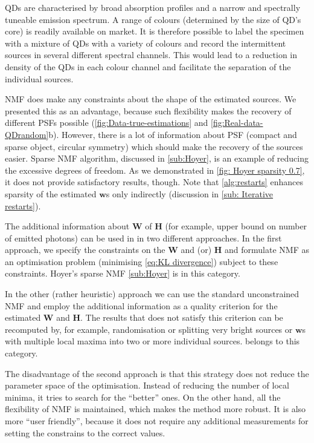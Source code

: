 QDs are characterised by broad absorption profiles and a narrow and spectrally tuneable emission spectrum. A range of colours (determined by the size of QD's core) is readily available on market. It is therefore possible to label the specimen with a mixture of QDs with a variety of colours and record the intermittent sources in several different spectral channels. This would lead to a reduction in density of the QDs in each colour channel and facilitate the separation of the individual sources. 

NMF does make any constraints about the shape of the estimated sources. We presented this as an advantage, because such flexibility makes the recovery of different PSFs possible (\autoref{fig:Data-true-estimations} and \ref{fig:Real-data-QDrandom}b). However, there is a lot of information about PSF (compact and sparse object, circular symmetry) which should make the recovery of the sources easier. Sparse NMF algorithm, discussed in \autoref{sub:Hoyer}, is an example of reducing the excessive degrees of freedom. As we demonstrated in \autoref{fig: Hoyer sparsity 0.7}, it does not provide satisfactory results, though. Note that \autoref{alg:restarts} enhances sparsity of the estimated $\bm{w}$s only indirectly (discussion in \autoref{sub: Iterative restarts}). 

The additional information about $\bm{W}$ of $\bm{H}$ (for example, upper bound on number of emitted photons) can be used in in two different approaches. In the first approach, we specify the constraints on the $\bm{W}$ and (or) $\bm{H}$ and formulate NMF as an optimisation problem (minimising \autoref{eq:KL divergence}) subject to these constraints. Hoyer's sparse NMF \autoref{sub:Hoyer} is in this category. 

In the other (rather heuristic) approach we can use the standard unconstrained NMF and employ the additional information as a quality criterion for the estimated $\bm{W}$ and $\bm{H}$. The results that does not satisfy this criterion can be recomputed by, for example, randomisation or splitting very bright sources or $\bm{w}$s with multiple local maxima into two or more individual sources.  belongs to this category.

The disadvantage of the second approach is that this strategy does not reduce the parameter space of the optimisation. Instead of reducing the number of local minima, it tries to search for the ``better'' ones. On the other hand, all the flexibility of NMF is maintained, which makes the method more robust. It is also more ``user friendly'', because it does not require any additional measurements for setting the constrains to the correct values.

